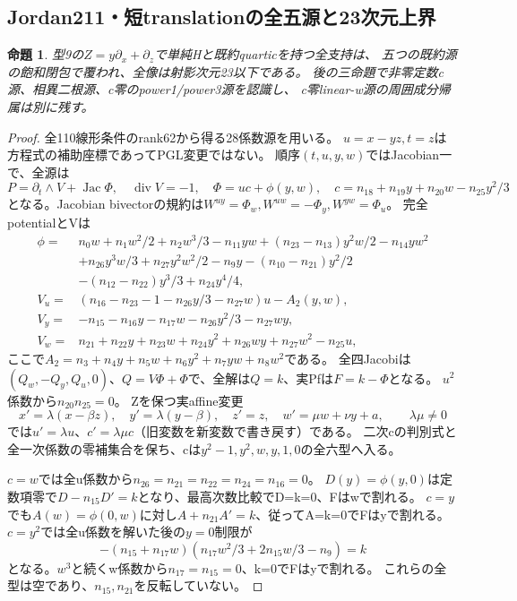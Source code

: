 \documentclass[a4paper,11pt]{ltjsarticle}
\newtheorem{proposition}{命題}[section]
\theoremstyle{definition}
\begin{document}
\subsection{Jordan211・短translationの全五源と23次元上界}
\begin{proposition}\label{prop:quartic-Ga9-bound}
型9の$Z=y\partial_x+\partial_z$で単純Hと既約quarticを持つ全支持は、
五つの既約源の飽和閉包で覆われ、全像は射影次元23以下である。
後の三命題で非零定数c源、相異二根源、c零のpower1/power3源を認識し、
c零linear-w源の周囲成分帰属は別に残す。
\end{proposition}
\begin{proof}
全110線形条件のrank62から得る28係数源を用いる。
$u=x-yz,t=z$は方程式の補助座標であってPGL変更ではない。
順序$(t,u,y,w)$ではJacobian一で、全源は
\[
 P=\partial_t\wedge V+\operatorname{Jac}\Phi,\quad\operatorname{div}V=-1,
 \quad \Phi=uc+\phi(y,w),\quad c=n_{18}+n_{19}y+n_{20}w-n_{25}y^2/3
\]
となる。Jacobian bivectorの規約は$W^{uy}=\Phi_w,W^{uw}=-\Phi_y,W^{yw}=\Phi_u$。
完全potentialとVは
\[
\begin{aligned}
 \phi={}&n_0w+n_1w^2/2+n_2w^3/3-n_{11}yw+(n_{23}-n_{13})y^2w/2-n_{14}yw^2\\
 &+n_{26}y^3w/3+n_{27}y^2w^2/2-n_9y-(n_{10}-n_{21})y^2/2\\
 &-(n_{12}-n_{22})y^3/3+n_{24}y^4/4,\\
 V_u={}&(n_{16}-n_{23}-1-n_{26}y/3-n_{27}w)u-A_2(y,w),\\
 V_y={}&-n_{15}-n_{16}y-n_{17}w-n_{26}y^2/3-n_{27}wy,\\
 V_w={}&n_{21}+n_{22}y+n_{23}w+n_{24}y^2+n_{26}wy+n_{27}w^2-n_{25}u,
\end{aligned}
\]
ここで$A_2=n_3+n_4y+n_5w+n_6y^2+n_7yw+n_8w^2$である。
全四Jacobiは$(Q_w,-Q_y,Q_u,0)$、$Q=V\Phi+\Phi$で、全解は$Q=k$、実Pfは$F=k-\Phi$となる。
$u^2$係数から$n_{20}n_{25}=0$。
Zを保つ実affine変更
\[
 x'=\lambda(x-\beta z),\quad y'=\lambda(y-\beta),\quad z'=z,
 \quad w'=\mu w+\nu y+a,\qquad\lambda\mu\ne0
\]
では$u'=\lambda u$、$c'=\lambda\mu c$（旧変数を新変数で書き戻す）である。
二次cの判別式と全一次係数の零補集合を保ち、cは$y^2-1,y^2,w,y,1,0$の全六型へ入る。

$c=w$では全u係数から$n_{26}=n_{21}=n_{22}=n_{24}=n_{16}=0$。
$D(y)=\phi(y,0)$は定数項零で$D-n_{15}D'=k$となり、最高次数比較でD=k=0、Fはwで割れる。
$c=y$でも$A(w)=\phi(0,w)$に対し$A+n_{21}A'=k$、従ってA=k=0でFはyで割れる。
$c=y^2$では全u係数を解いた後の$y=0$制限が
\[
 -(n_{15}+n_{17}w)(n_{17}w^2/3+2n_{15}w/3-n_9)=k
\]
となる。$w^3$と続くw係数から$n_{17}=n_{15}=0$、k=0でFはyで割れる。
これらの全型は空であり、$n_{15},n_{21}$を反転していない。


\end{proof}
\end{document}
